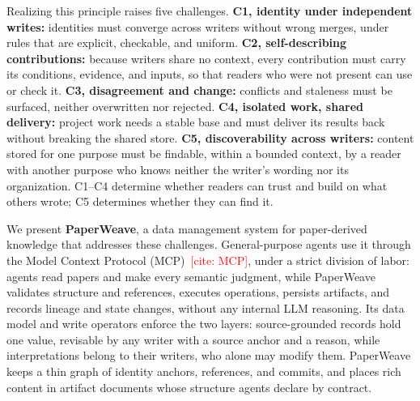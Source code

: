 \documentclass[sigconf,review,anonymous]{acmart}
\newcommand{\citeneeded}[1]{\textcolor{red}{[cite: #1]}}
\begin{document}
Realizing this principle raises five challenges.
\textbf{C1, identity under independent writes:} identities must converge across
writers without wrong merges, under rules that are explicit, checkable, and
uniform.
\textbf{C2, self-describing contributions:} because writers share no context,
every contribution must carry its conditions, evidence, and inputs, so that
readers who were not present can use or check it.
\textbf{C3, disagreement and change:} conflicts and staleness must be surfaced,
neither overwritten nor rejected.
\textbf{C4, isolated work, shared delivery:} project work needs a stable base
and must deliver its results back without breaking the shared store.
\textbf{C5, discoverability across writers:} content stored for one purpose
must be findable, within a bounded context, by a reader with another purpose
who knows neither the writer's wording nor its organization.
C1--C4 determine whether readers can trust and build on what others wrote; C5
determines whether they can find it.

We present \textbf{PaperWeave}, a data management system for paper-derived
knowledge that addresses these challenges. General-purpose agents use it
through the Model Context Protocol (MCP)~\citeneeded{MCP}, under a strict
division of labor: agents read papers and make every semantic judgment, while
PaperWeave validates structure and references, executes operations, persists
artifacts, and records lineage and state changes, without any internal LLM
reasoning. Its data model and write operators enforce the two layers:
source-grounded records hold one value, revisable by any writer with a source
anchor and a reason, while interpretations belong to their writers, who alone
may modify them. PaperWeave keeps a thin graph of identity anchors, references,
and commits, and places rich content in artifact documents whose structure
agents declare by contract.
\end{document}
